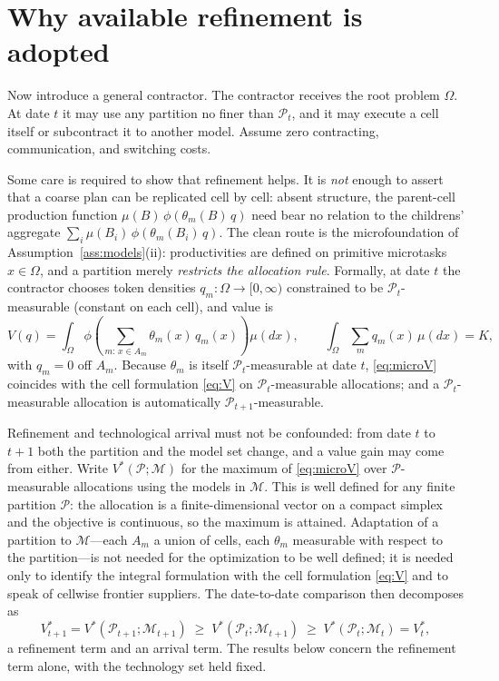 \documentclass[11pt]{article}
\theoremstyle{definition}
\theoremstyle{remark}
\begin{document}
\section{Why available refinement is adopted}
\label{sec:subdivision}

Now introduce a general contractor. The contractor receives the root problem $\Omega$. At date $t$ it may use any partition no finer than $\mathcal{P}_t$, and it may execute a cell itself or subcontract it to another model. Assume zero contracting, communication, and switching costs.

Some care is required to show that refinement helps. It is \emph{not} enough to assert that a coarse plan can be replicated cell by cell: absent structure, the parent-cell production function $\mu(B)\,\phi(\theta_m(B)\,q)$ need bear no relation to the childrens' aggregate $\sum_i \mu(B_i)\,\phi(\theta_m(B_i)\,q)$. The clean route is the microfoundation of Assumption~\ref{ass:models}(ii): productivities are defined on primitive microtasks $x \in \Omega$, and a partition merely \emph{restricts the allocation rule}. Formally, at date $t$ the contractor chooses token densities $q_m : \Omega \to [0,\infty)$ constrained to be $\mathcal{P}_t$-measurable (constant on each cell), and value is
\begin{equation}
\label{eq:microV}
V(q) = \int_\Omega \phi\!\left( \sum_{m :\, x \in A_m} \theta_m(x)\, q_m(x) \right) \mu(dx),
\qquad
\int_\Omega \sum_m q_m(x)\, \mu(dx) = K,
\end{equation}
with $q_m = 0$ off $A_m$.
Because $\theta_m$ is itself $\mathcal{P}_t$-measurable at date $t$, \eqref{eq:microV} coincides with the cell formulation \eqref{eq:V} on $\mathcal{P}_t$-measurable allocations; and a $\mathcal{P}_t$-measurable allocation is automatically $\mathcal{P}_{t+1}$-measurable.

Refinement and technological arrival must not be confounded: from date $t$ to $t{+}1$ both the partition and the model set change, and a value gain may come from either. Write $V^*(\mathcal{P}; \mathcal{M})$ for the maximum of \eqref{eq:microV} over $\mathcal{P}$-measurable allocations using the models in $\mathcal{M}$. This is well defined for any finite partition $\mathcal{P}$: the allocation is a finite-dimensional vector on a compact simplex and the objective is continuous, so the maximum is attained. Adaptation of a partition to $\mathcal{M}$---each $A_m$ a union of cells, each $\theta_m$ measurable with respect to the partition---is not needed for the optimization to be well defined; it is needed only to identify the integral formulation with the cell formulation \eqref{eq:V} and to speak of cellwise frontier suppliers. The date-to-date comparison then decomposes as
\begin{equation}
V^*_{t+1} = V^*(\mathcal{P}_{t+1}; \mathcal{M}_{t+1})
\;\ge\; V^*(\mathcal{P}_t; \mathcal{M}_{t+1})
\;\ge\; V^*(\mathcal{P}_t; \mathcal{M}_t) = V^*_t,
\end{equation}
a refinement term and an arrival term. The results below concern the refinement term alone, with the technology set held fixed.
\end{document}
